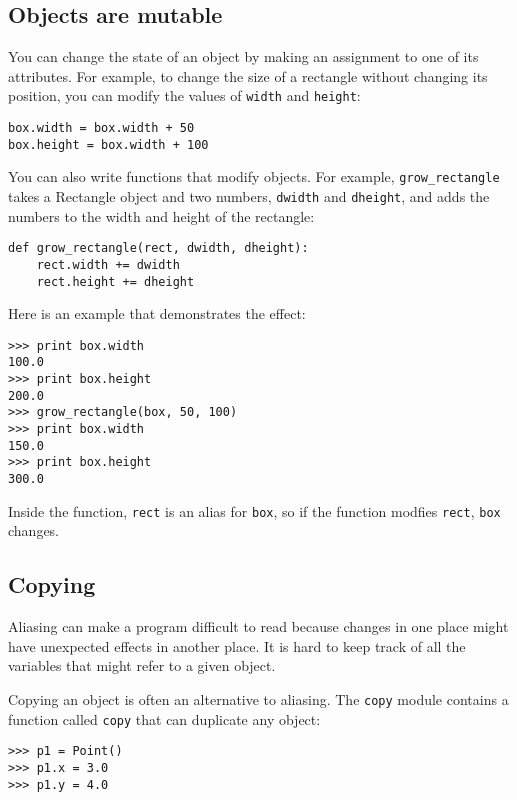 \documentclass{article}
\begin{document}
\begin{multicols}{2}
\subsection{Objects are mutable}
You can change the state of an object by making an assignment to one of its
attributes. For example, to change the size of a rectangle without changing
its position, you can modify the values of \verb|width| and \verb|height|:
\begin{verbatim}
box.width = box.width + 50
box.height = box.width + 100
\end{verbatim}
You can also write functions that modify objects. For example,
\verb|grow_rectangle| takes a Rectangle object and two numbers,
\verb|dwidth| and \verb|dheight|, and adds the numbers to the width and
height of the rectangle:
\begin{verbatim}
def grow_rectangle(rect, dwidth, dheight):
    rect.width += dwidth
    rect.height += dheight
\end{verbatim}
Here is an example that demonstrates the effect:
\begin{verbatim}
>>> print box.width
100.0
>>> print box.height
200.0
>>> grow_rectangle(box, 50, 100)
>>> print box.width
150.0
>>> print box.height
300.0
\end{verbatim}
Inside the function, \verb|rect| is an alias for \verb|box|, so if the
function modfies \verb|rect|, \verb|box| changes.

\subsection{Copying}
Aliasing can make a program difficult to read because changes in one place
might have unexpected effects in another place. It is hard to keep track of
all the variables that might refer to a given object.

Copying an object is often an alternative to aliasing. The \verb|copy|
module contains a function called \verb|copy| that can duplicate any
object:
\begin{verbatim}
>>> p1 = Point()
>>> p1.x = 3.0
>>> p1.y = 4.0


\end{verbatim}
\end{multicols}
\end{document}
